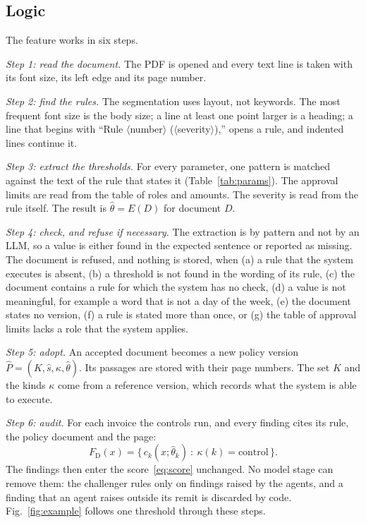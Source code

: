 \documentclass[conference]{IEEEtran}
\begin{document}
\subsection{Logic}
\label{sec:logic}
The feature works in six steps.

\textit{Step 1: read the document.} The PDF is opened and every text line is taken with its font size, its left edge and its page number.

\textit{Step 2: find the rules.} The segmentation uses layout, not keywords. The most frequent font size is the body size; a line at least one point larger is a heading; a line that begins with ``Rule $\langle$number$\rangle$ ($\langle$severity$\rangle$),'' opens a rule, and indented lines continue it.

\textit{Step 3: extract the thresholds.} For every parameter, one pattern is matched against the text of the rule that states it (Table~\ref{tab:params}). The approval limits are read from the table of roles and amounts. The severity is read from the rule itself. The result is $\hat{\theta}=E(D)$ for document $D$.

\textit{Step 4: check, and refuse if necessary.} The extraction is by pattern and not by an LLM, so a value is either found in the expected sentence or reported as missing. The document is refused, and nothing is stored, when (a) a rule that the system executes is absent, (b) a threshold is not found in the wording of its rule, (c) the document contains a rule for which the system has no check, (d) a value is not meaningful, for example a word that is not a day of the week, (e) the document states no version, (f) a rule is stated more than once, or (g) the table of approval limits lacks a role that the system applies.

\textit{Step 5: adopt.} An accepted document becomes a new policy version $\hat{P}=(K,\hat{s},\kappa,\hat{\theta})$. Its passages are stored with their page numbers. The set $K$ and the kinds $\kappa$ come from a reference version, which records what the system is able to execute.

\textit{Step 6: audit.} For each invoice the controls run, and every finding cites its rule, the policy document and the page:
\begin{equation}
F_{\mathrm{D}}(x)=\bigl\{\,c_k(x;\hat{\theta}_k)\ :\ \kappa(k)=\text{control}\,\bigr\}.
\label{eq:controls}
\end{equation}
The findings then enter the score~\eqref{eq:score} unchanged. No model stage can remove them: the challenger rules only on findings raised by the agents, and a finding that an agent raises outside its remit is discarded by code. Fig.~\ref{fig:example} follows one threshold through these steps.
\end{document}
